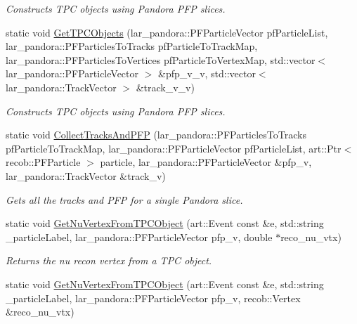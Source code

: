 \begin{DoxyCompactItemize}
\begin{DoxyCompactList}\small\item\em \-Constructs \-T\-P\-C objects using \-Pandora \-P\-F\-P slices. \end{DoxyCompactList}\item 
static void \hyperlink{classUBXSecHelper_a900fbd13023a46b8d3c0a38aae84a10b}{\-Get\-T\-P\-C\-Objects} (lar\-\_\-pandora\-::\-P\-F\-Particle\-Vector pf\-Particle\-List, lar\-\_\-pandora\-::\-P\-F\-Particles\-To\-Tracks pf\-Particle\-To\-Track\-Map, lar\-\_\-pandora\-::\-P\-F\-Particles\-To\-Vertices pf\-Particle\-To\-Vertex\-Map, std\-::vector$<$ lar\-\_\-pandora\-::\-P\-F\-Particle\-Vector $>$ \&pfp\-\_\-v\-\_\-v, std\-::vector$<$ lar\-\_\-pandora\-::\-Track\-Vector $>$ \&track\-\_\-v\-\_\-v)
\begin{DoxyCompactList}\small\item\em \-Constructs \-T\-P\-C objects using \-Pandora \-P\-F\-P slices. \end{DoxyCompactList}\item 
static void \hyperlink{classUBXSecHelper_ab441342f0c71741e353f323a26f27728}{\-Collect\-Tracks\-And\-P\-F\-P} (lar\-\_\-pandora\-::\-P\-F\-Particles\-To\-Tracks pf\-Particle\-To\-Track\-Map, lar\-\_\-pandora\-::\-P\-F\-Particle\-Vector pf\-Particle\-List, art\-::\-Ptr$<$ recob\-::\-P\-F\-Particle $>$ particle, lar\-\_\-pandora\-::\-P\-F\-Particle\-Vector \&pfp\-\_\-v, lar\-\_\-pandora\-::\-Track\-Vector \&track\-\_\-v)
\begin{DoxyCompactList}\small\item\em \-Gets all the tracks and \-P\-F\-P for a single \-Pandora slice. \end{DoxyCompactList}\item 
static void \hyperlink{classUBXSecHelper_a0ffc9245fc9813c18a1880d7e6f0aefe}{\-Get\-Nu\-Vertex\-From\-T\-P\-C\-Object} (art\-::\-Event const \&e, std\-::string \-\_\-particle\-Label, lar\-\_\-pandora\-::\-P\-F\-Particle\-Vector pfp\-\_\-v, double $\ast$reco\-\_\-nu\-\_\-vtx)
\begin{DoxyCompactList}\small\item\em \-Returns the nu recon vertex from a \-T\-P\-C object. \end{DoxyCompactList}\item 
static void \hyperlink{classUBXSecHelper_a092b41510117ee216ea323ea46695e1b}{\-Get\-Nu\-Vertex\-From\-T\-P\-C\-Object} (art\-::\-Event const \&e, std\-::string \-\_\-particle\-Label, lar\-\_\-pandora\-::\-P\-F\-Particle\-Vector pfp\-\_\-v, recob\-::\-Vertex \&reco\-\_\-nu\-\_\-vtx)

\end{DoxyCompactItemize}
